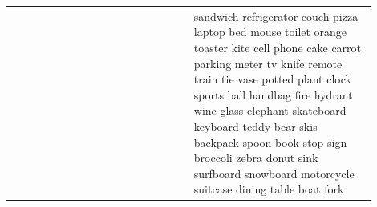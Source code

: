 \begin{table}[t]
{\begin{tabular}{p{0.45\linewidth} | p{0.45\linewidth}}
&
sandwich\newline
refrigerator\newline
couch\newline
pizza\newline
laptop\newline
bed\newline
mouse\newline
toilet\newline
orange\newline
toaster\newline
kite\newline
cell phone\newline
cake\newline
carrot\newline
parking meter\newline
tv\newline
knife\newline
remote\newline
train\newline
tie\newline
vase\newline
potted plant\newline
clock\newline
sports ball\newline
handbag\newline
fire hydrant\newline
wine glass\newline
elephant\newline
skateboard\newline
keyboard\newline
teddy bear\newline
skis\newline
backpack\newline
spoon\newline
book\newline
stop sign\newline
broccoli\newline
zebra\newline
donut\newline
sink\newline
surfboard\newline
snowboard\newline
motorcycle\newline
suitcase\newline
dining table\newline
boat\newline
fork\newline

\end{tabular}}
\end{table}
